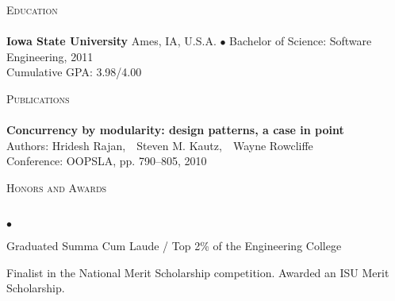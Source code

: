 \documentclass{article}
\newcommand{\lineunder} {
	\vspace*{-8pt} \\ \hspace*{-18pt} \hrulefill \\
}
\newcommand{\header}[1] {
	{\hspace*{-15pt}\vspace*{6pt} \textsc{#1}} \vspace*{-6pt} \lineunder
}
\newcommand{\paper}[5] {
	{\textbf{#1}\\ \hspace*{15pt}Authors: #2\\ \hspace*{15pt}#3, #4, #5\\ \vspace*{8pt}}
}
\newenvironment{achievements} {
	\begin{list}{$\bullet$}
		{\topsep 0pt \itemsep -2pt}
	}{
		\vspace*{4pt}\end{list}
	}
\newcommand{\school}[4] {
	\textbf{#1} #2 $\bullet$ #3\\
	\hspace*{15pt}#4 \\
	\vspace*{5pt}
}
\begin{document}
\header{Education}

	\school{Iowa State University}{Ames, IA, U.S.A.}{Bachelor of Science: Software Engineering, 2011}
	{Cumulative GPA: 3.98/4.00}

\header{Publications}

   \paper{Concurrency by modularity: design patterns, a case in point}{Hridesh Rajan,~ Steven M. Kautz,~ Wayne Rowcliffe}
      {Conference: OOPSLA}{pp. 790--805}{2010}


\header{Honors and Awards}

	\begin{achievements}
		\item{Graduated Summa Cum Laude / Top 2\% of the Engineering College}
		\item{Finalist in the National Merit Scholarship competition. Awarded an ISU Merit Scholarship.}
	\end{achievements}
\end{document}
